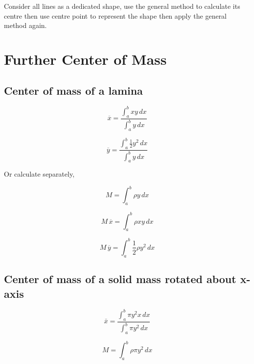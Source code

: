 \documentclass[a4paper,9pt]{scrartcl}
\begin{document}
    Consider all lines as a dedicated shape, use the general method to calculate its centre then use centre point to represent the shape then apply the general method again.


    \section{Further Center of Mass}

    \subsection{Center of mass of a lamina}

    \begin{displaymath}
        \overline{x} = \frac{\int_{a}^{b} xy \,dx}{\int_{a}^{b} y \,dx}
    \end{displaymath}

    \begin{displaymath}
        \overline{y} = \frac{\int_{a}^{b} \frac{1}{2}y^2 \,dx}{\int_{a}^{b} y \,dx}
    \end{displaymath}

    Or calculate separately,

    \begin{displaymath}
        M = \int_{a}^{b} {\rho}y \,dx
    \end{displaymath}

    \begin{displaymath}
        M\,\overline{x} = \int_{a}^{b} {\rho}xy \,dx
    \end{displaymath}

    \begin{displaymath}
        M\,\overline{y} = \int_{a}^{b} \frac{1}{2} {\rho}y^2 \,dx
    \end{displaymath}

    \subsection{Center of mass of a solid mass rotated about x-axis}

    \begin{displaymath}
        \bar{x} = \frac{\int_{a}^{b} {\pi} y^2 x\,dx}{\int_{a}^{b} \pi y^2 \,dx}
    \end{displaymath}

    \begin{displaymath}
        M = \int_{a}^{b} \rho {\pi} y^2 \,dx
    \end{displaymath}
\end{document}
